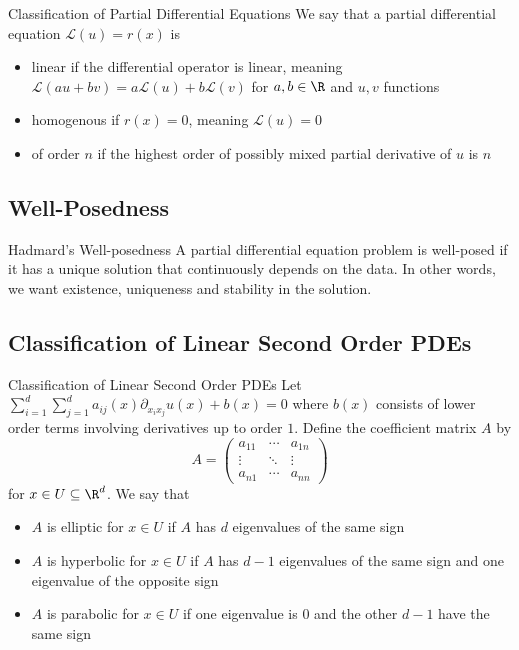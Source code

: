 \documentclass[a4paper]{article}
\begin{document}
\begin{defn}{Classification of Partial Differential Equations}{} We say that a partial differential equation $\mathcal{L}(u)=r(x)$ is 
\begin{itemize}
\item linear if the differential operator is linear, meaning $\mathcal{L}(au+bv)=a\mathcal{L}(u)+b\mathcal{L}(v)$ for $a,b\in\R$ and $u,v$ functions
\item homogenous if $r(x)=0$, meaning $\mathcal{L}(u)=0$
\item of order $n$ if the highest order of possibly mixed partial derivative of $u$ is $n$
\end{itemize}
\end{defn}

\subsection{Well-Posedness}
\begin{defn}{Hadmard's Well-posedness}{} A partial differential equation problem is well-posed if it has a unique solution that continuously depends on the data. In other words, we want existence, uniqueness and stability in the solution. 
\end{defn}

\subsection{Classification of Linear Second Order PDEs}
\begin{defn}{Classification of Linear Second Order PDEs}{} Let $\sum_{i=1}^d\sum_{j=1}^da_{ij}(x)\partial_{x_ix_j}u(x)+b(x)=0$ where $b(x)$ consists of lower order terms involving derivatives up to order $1$. Define the coefficient matrix $A$ by $$A=\begin{pmatrix}
a_{11} & \cdots & a_{1n}\\
\vdots & \ddots & \vdots\\
a_{n1} & \cdots & a_{nn}
\end{pmatrix}$$ for $x\in U\subseteq\R^d$. We say that 
\begin{itemize}
\item $A$ is elliptic for $x\in U$ if $A$ has $d$ eigenvalues of the same sign
\item $A$ is hyperbolic for $x\in U$ if $A$ has $d-1$ eigenvalues of the same sign and one eigenvalue of the opposite sign
\item $A$ is parabolic for $x\in U$ if one eigenvalue is $0$ and the other $d-1$ have the same sign
\end{itemize}
\end{defn}
\end{document}
